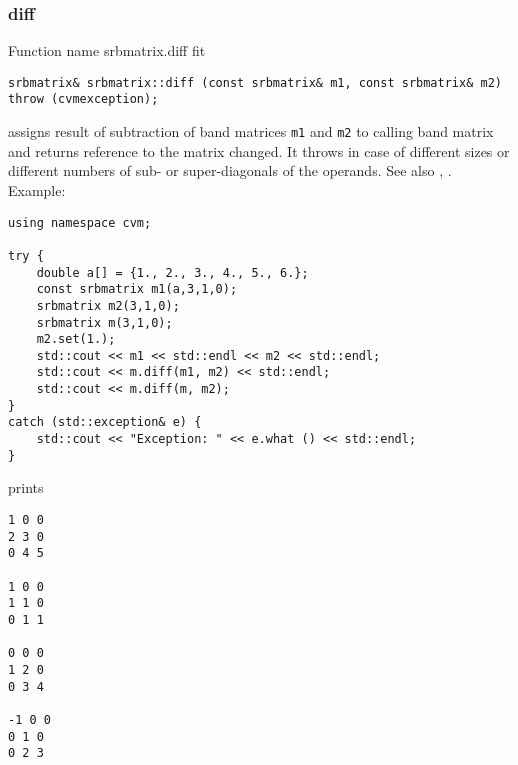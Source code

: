 \subsubsection{diff}
Function%
\pdfdest name {srbmatrix.diff} fit
\begin{verbatim}
srbmatrix& srbmatrix::diff (const srbmatrix& m1, const srbmatrix& m2)
throw (cvmexception);
\end{verbatim}
assigns  result of subtraction of
band matrices \verb"m1" and \verb"m2" to  calling band matrix
and returns  reference to
the matrix changed.
It throws  
in case of different sizes or different numbers of sub- or super-diagonals
of the operands.
See also ,
.
Example:
\begin{Verbatim}
using namespace cvm;

try {
    double a[] = {1., 2., 3., 4., 5., 6.};
    const srbmatrix m1(a,3,1,0);
    srbmatrix m2(3,1,0);
    srbmatrix m(3,1,0);
    m2.set(1.);
    std::cout << m1 << std::endl << m2 << std::endl;
    std::cout << m.diff(m1, m2) << std::endl;
    std::cout << m.diff(m, m2);
}
catch (std::exception& e) {
    std::cout << "Exception: " << e.what () << std::endl;
}
\end{Verbatim}
prints
\begin{Verbatim}
1 0 0
2 3 0
0 4 5

1 0 0
1 1 0
0 1 1

0 0 0
1 2 0
0 3 4

-1 0 0
0 1 0
0 2 3
\end{Verbatim}
\newpage





